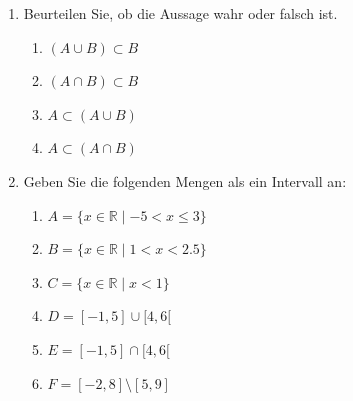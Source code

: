 \begin{ueb}
\begin{enumerate}
        \item Beurteilen Sie, ob die Aussage wahr oder falsch ist.

              \begin{enumerate}
                  \item \((A \cup B) \subset B\)
                  \item \((A \cap B) \subset B\)
                  \item \(A \subset (A \cup B)\)
                  \item \(A \subset (A \cap B)\)
              \end{enumerate}
        \item Geben Sie die folgenden Mengen als ein Intervall an:

              \begin{enumerate}
                  \item \(A = \{x \in \mathbb{R} \mid -5 < x \leq 3\}\)
                  \item \(B = \{x \in \mathbb{R} \mid 1 < x < 2.5\}\)
                  \item \(C = \{x \in \mathbb{R} \mid x < 1\}\)
                  \item \(D = [-1,5] \cup [4,6[\)
                  \item \(E = [-1,5] \cap [4,6[\)
                  \item \(F = [-2,8] \setminus [5,9]\)
              \end{enumerate}
    \end{enumerate}
\end{ueb}

